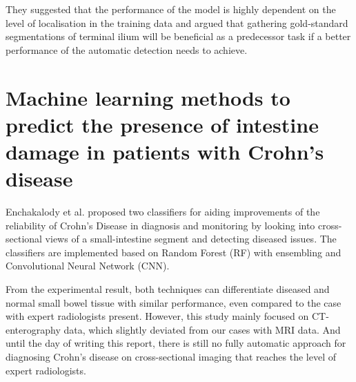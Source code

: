 \noindent They suggested that the performance of the model is highly dependent on the level of localisation in the training data and argued that gathering gold-standard segmentations of terminal ilium will be beneficial as a predecessor task if a better performance of the automatic detection needs to achieve.


\section{Machine learning methods to predict the presence of intestine damage in patients with Crohn’s disease}

Enchakalody et al. \cite{enchakalody2020machine} proposed two classifiers for aiding improvements of the reliability of Crohn's Disease in diagnosis and monitoring by looking into cross-sectional views of a small-intestine segment and detecting diseased issues. The classifiers are implemented based on Random Forest (RF) with ensembling and Convolutional Neural Network (CNN). \medskip

\noindent From the experimental result, both techniques can differentiate diseased and normal small bowel tissue with similar performance, even compared to the case with expert radiologists present. However, this study mainly focused on CT-enterography data, which slightly deviated from our cases with MRI data. And until the day of writing this report, there is still no fully automatic approach for diagnosing Crohn's disease on cross-sectional imaging that reaches the level of expert radiologists.